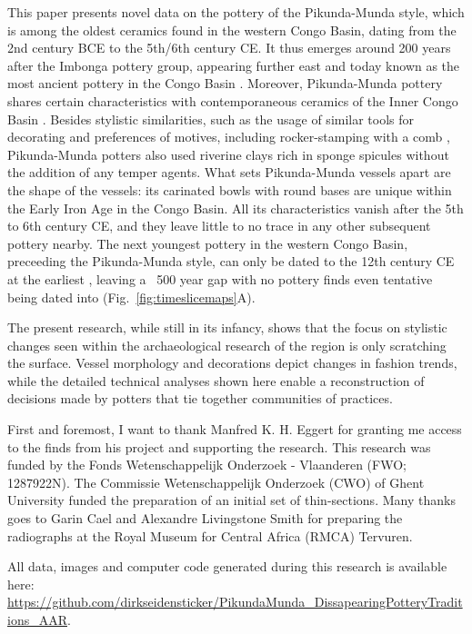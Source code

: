 \documentclass[smallextended,natbib]{svjour3}       %
\begin{document}
This paper presents novel data on the pottery of the Pikunda-Munda style, which is among the oldest ceramics found in the western Congo Basin, dating from the 2nd century BCE to the 5th/6th century CE. It thus emerges around 200 years after the Imbonga pottery group, appearing further east and today known as the most ancient pottery in the Congo Basin \cite[Fig.~\ref{fig:timeslicemaps};][59--68]{Wotzka.1995}. Moreover, Pikunda-Munda pottery shares certain characteristics with contemporaneous ceramics of the Inner Congo Basin \citep[107 Ftn.~4]{Wotzka.1995}. Besides stylistic similarities, such as the usage of similar tools for decorating and preferences of motives, including rocker-stamping with a comb \citep[118 Tab.~14]{Seidensticker.2021e}, Pikunda-Munda potters also used riverine clays rich in sponge spicules without the addition of any temper agents. What sets Pikunda-Munda vessels apart are the shape of the vessels: its carinated bowls with round bases are unique within the Early Iron Age in the Congo Basin. All its characteristics vanish after the 5th to 6th century CE, and they leave little to no trace in any other subsequent pottery nearby. The next youngest pottery in the western Congo Basin, preceeding the Pikunda-Munda style, can only be dated to the 12th century CE at the earliest \citep[Tab.~2: RICH-30864]{Seidensticker.2024}, leaving a ~500 year gap with no pottery finds even tentative being dated into (Fig.~\ref{fig:timeslicemaps}A).

The present research, while still in its infancy, shows that the focus on stylistic changes seen within the archaeological research of the region \citep{Wotzka.1995,Seidensticker.2021e} is only scratching the surface. Vessel morphology and decorations depict changes in fashion trends, while the detailed technical analyses shown here enable a reconstruction of decisions made by potters that tie together communities of practices.

\begin{acknowledgements}
First and foremost, I want to thank Manfred K. H. Eggert for granting me access to the finds from his project and supporting the research. This research was funded by the Fonds Wetenschappelijk Onderzoek - Vlaanderen (FWO; 1287922N). The Commissie Wetenschappelijk Onderzoek (CWO) of Ghent University funded the preparation of an initial set of thin-sections. Many thanks goes to Garin Cael and Alexandre Livingstone Smith for preparing the radiographs at the Royal Museum for Central Africa (RMCA) Tervuren.

All data, images and computer code generated during this research is available here: \url{https://github.com/dirkseidensticker/PikundaMunda_DissapearingPotteryTraditions_AAR}.
\end{acknowledgements}



\end{document}
